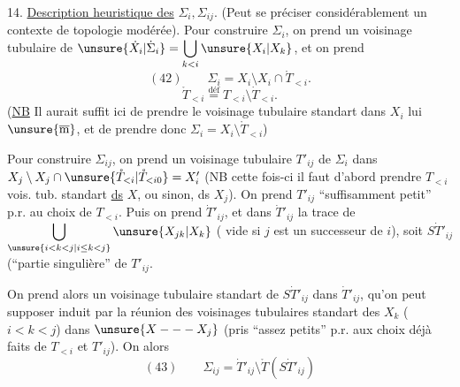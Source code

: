 14. \uline{Description heuristique des} $\Sigma_i,\Sigma_{ij}$.
(Peut se préciser considérablement  un contexte de topologie modérée).
Pour construire $\Sigma_i$, on prend un voisinage tubulaire
  de
$\unsure{\dot X_i|\dot\Sigma_i}=\displaystyle\bigcup_{k<i}\unsure{X_i|X_k}$, et on prend
\[
(42)\qquad\Sigma_i=X_i\setminus X_i\cap\mathring T_{<i}.
\]
\[
\mathring T_{<i}\overset{\mathrm{déf}}{=}T_{<i}\setminus\dot T_{<i}.
\]
(\uline{NB} Il aurait suffit ici de prendre le voisinage tubulaire
standart dans $X_i$ lui $\unsure{\overline{\mathrm m}}$, et de prendre donc
$\Sigma_i=X_i\setminus\mathring T_{<i}$)

Pour construire $\Sigma_{ij}$, on prend un voisinage tubulaire
$T'_{ij}$ de $\Sigma_i$ dans
$X_j\setminus X_j\cap\unsure{\mathring T_{<i}|\mathring T_{<i0}}=X'_i$
(NB cette fois-ci il faut  d'abord prendre
$T_{<i}$ vois. tub. standart \uline{ds} $X$, ou sinon, ds $X_j$).
On prend $T'_{ij}$ ``suffisamment petit'' p.r. au choix de $T_{<i}$.
Puis on prend $\dot T'_{ij}$, et dans $\dot T'_{ij}$
la trace de $\displaystyle\bigcup_{\unsure{i<k<j|i\leq k<j}}\unsure{X_{jk}|X_k}$
( vide si $j$ est un successeur de $i$), soit $S\dot T'_{ij}$
(``partie singulière'' de $T'_{ij}$.


On prend alors un voisinage tubulaire standart
 de $S\dot T'_{ij}$ dans $\dot T'_{ij}$,
qu'on peut supposer induit par la réunion 
des voisinages tubulaires standart des $X_k$ ($i<k<j$)
dans $\unsure{X---X_j}$
(pris ``assez petits'' p.r. aux choix déjà faits de $T_{<i}$
et  $T'_{ij}$).
On  alors
\[
(43)\qquad\Sigma_{ij}=\dot T'_{ij}\setminus\mathring T(S\dot T'_{ij})
\]
